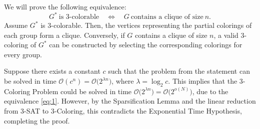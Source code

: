 \documentclass[12pt]{article}
\begin{document}
	\medskip
	
	We will prove the following equivalence:
	\begin{equation}
		G^{\ast} \ \text{is \(3\)-colorable} \quad \iff \quad G \
		\text{contains a clique of size} \ n \text{.} \label{eq:1}
	\end{equation}
	Assume \(G^{\ast}\) is \(3\)-colorable. Then, the vertices representing the
	partial colorings of each group form a clique. Conversely, if \(G\) contains
	a clique of size \(n\), a valid \(3\)-coloring of \(G^{\ast}\) can be
	constructed by selecting the corresponding colorings for every group.
	
	\medskip
	
	Suppose there exists a constant \(c\) such that the problem from the
	statement can be solved in time \(\mathcal{O}(c^{n}) =
	\mathcal{O} \big( 2^{\lambda n} \big)\), where \(\lambda = \log_{2} c\).
	This implies that the \(3\)-Coloring Problem could be solved in time
	\(\mathcal{O} \big( 2^{\lambda n} \big) = \mathcal{O}\big( 2^{o(N)} \big)\),
	due to the equivalence \eqref{eq:1}. However, by the Sparsification Lemma
	and the linear reduction from \(3\)-SAT to \(3\)-Coloring, this contradicts
	the Exponential Time Hypothesis, completing the proof.
\end{document}

